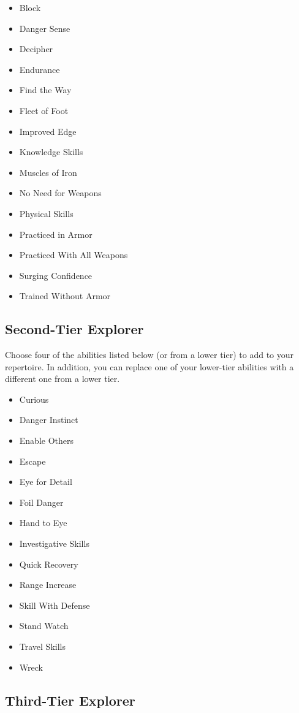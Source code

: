 \begin{multicols}{2}
\begin{itemize}
\item Block
\item Danger Sense
\item Decipher
\item Endurance
\item Find the Way
\item Fleet of Foot
\item Improved Edge
\item Knowledge Skills
\item Muscles of Iron
\item No Need for Weapons
\item Physical Skills
\item Practiced in Armor
\item Practiced With All Weapons
\item Surging Confidence
\item Trained Without Armor
\end{itemize}

\subsection{Second-Tier Explorer}

Choose four of the abilities listed below (or from a lower tier) to add to your repertoire. In addition, you can replace one of your lower-tier abilities with a different one from a lower tier.

\begin{itemize}
\item Curious
\item Danger Instinct
\item Enable Others
\item Escape
\item Eye for Detail 
\item Foil Danger
\item Hand to Eye
\item Investigative Skills
\item Quick Recovery
\item Range Increase
\item Skill With Defense
\item Stand Watch
\item Travel Skills
\item Wreck
\end{itemize}

\subsection{Third-Tier Explorer}


\end{multicols}
